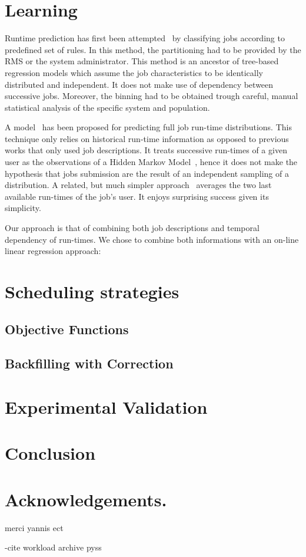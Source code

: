\documentclass{llncs}
\begin{document}
\section{Learning}
\label{sec:learning}
Runtime prediction has first been attempted~\cite{gibbons} by classifying jobs according to predefined set of rules. In this method, the partitioning had to be provided by the RMS or the system administrator. This method is an ancestor of tree-based regression models which assume the job characteristics to be identically distributed and independent. It does not make use of dependency between successive jobs. Moreover, the binning had to be obtained trough careful, manual statistical analysis of the specific system and population.

A model~\cite{hmm} has been proposed for predicting full job run-time distributions. This technique only relies on historical run-time information as opposed to previous works that only used job descriptions. It treats successive run-times of a given user as the observations of a Hidden Markov Model~\cite{rabiner}, hence it does not make the hypothesis that jobs submission are the result of an independent sampling of a distribution.
A related, but much simpler approach~\cite{tsafir} averages the two last available run-times of the job's user. It enjoys surprising success given its simplicity.

Our approach is that of combining both job descriptions and temporal dependency of run-times. We chose to combine both informations with an on-line linear regression approach:


\section{Scheduling strategies}
\label{sec:scheduling_strategies}

\subsection{Objective Functions}
\label{sub:objective_functions}

\subsection{Backfilling with Correction}
\label{sub:backfilling_with_correction}


\section{Experimental Validation}
\label{sec:experimental_validation}

\section{Conclusion}
\label{sec:conclusion}

\section*{Acknowledgements.}
\label{sec:ack}
merci yannis ect

-cite
workload archive
pyss




\end{document}
